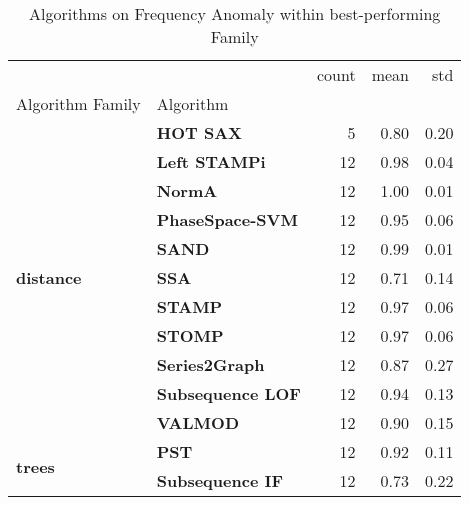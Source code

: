 \begin{table}[h]
\centering
\caption{Algorithms on Frequency Anomaly within best-performing Family}
\label{tab:bp-frequency}
\begin{tabular}{llrrr}
\toprule
 &  & count & mean & std \\
Algorithm Family & Algorithm &  &  &  \\
\midrule
\multirow[t]{11}{*}{\textbf{distance}} & \textbf{HOT SAX} & 5 & 0.80 & 0.20 \\
\textbf{} & \textbf{Left STAMPi} & 12 & 0.98 & 0.04 \\
\textbf{} & \textbf{NormA} & 12 & 1.00 & 0.01 \\
\textbf{} & \textbf{PhaseSpace-SVM} & 12 & 0.95 & 0.06 \\
\textbf{} & \textbf{SAND} & 12 & 0.99 & 0.01 \\
\textbf{} & \textbf{SSA} & 12 & 0.71 & 0.14 \\
\textbf{} & \textbf{STAMP} & 12 & 0.97 & 0.06 \\
\textbf{} & \textbf{STOMP} & 12 & 0.97 & 0.06 \\
\textbf{} & \textbf{Series2Graph} & 12 & 0.87 & 0.27 \\
\textbf{} & \textbf{Subsequence LOF} & 12 & 0.94 & 0.13 \\
\textbf{} & \textbf{VALMOD} & 12 & 0.90 & 0.15 \\
\cline{1-5}
\multirow[t]{2}{*}{\textbf{trees}} & \textbf{PST} & 12 & 0.92 & 0.11 \\
\textbf{} & \textbf{Subsequence IF} & 12 & 0.73 & 0.22 \\
\cline{1-5}
\bottomrule
\end{tabular}
\end{table}
